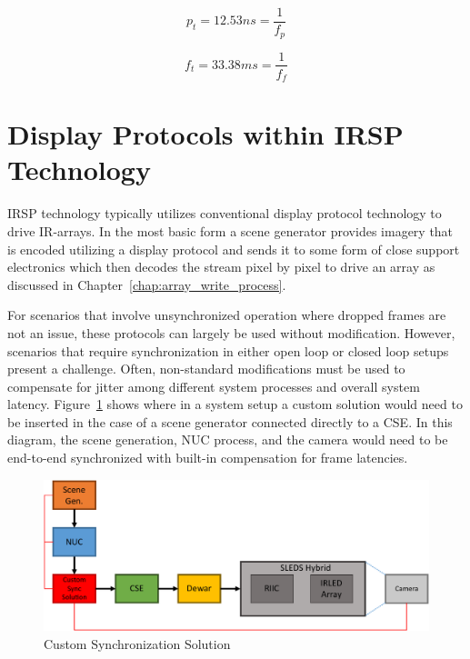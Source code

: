     \begin{equation}
        p_t=12.53ns={\frac{1}{f_p}}
        \label{eq:p_t_solve}
    \end{equation}

    \begin{equation}
        f_t=33.38ms={\frac{1}{f_f}}
        \label{eq:f_t_solve}
    \end{equation}

\section{Display Protocols within IRSP Technology}
    \label{sec:displays_within_proj_system}
    IRSP technology typically utilizes conventional display protocol technology to drive IR-arrays. In the most basic form a scene generator provides imagery that is encoded utilizing a display protocol and sends it to some form of close support electronics which then decodes the stream pixel by pixel to drive an array as discussed in Chapter~\ref{chap:array_write_process}.

    For scenarios that involve unsynchronized operation where dropped frames are not an issue, these protocols can largely be used without modification. However, scenarios that require synchronization in either open loop or closed loop setups present a challenge. Often, non-standard modifications must be used to compensate for jitter among different system processes and overall system latency. Figure~\ref{fig:custom_sync} shows where in a system setup a custom solution would need to be inserted in the case of a scene generator connected directly to a CSE. In this diagram, the scene generation, NUC process, and the camera would need to be end-to-end synchronized with built-in compensation for frame latencies.

    \begin{figure}
        \centering
        \includegraphics[width=1.0\textwidth]{fig/custom_sync.pdf}
        \caption{Custom Synchronization Solution}
        \label{fig:custom_sync}
    \end{figure}


